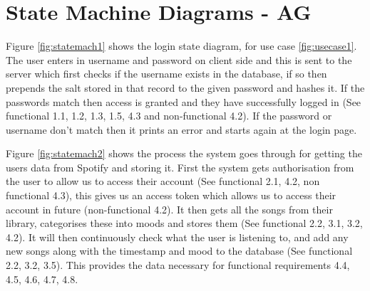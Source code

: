 \documentclass[10pt, notitlepage]{report}
\begin{document}
\section{State Machine Diagrams - AG}

Figure \ref{fig:statemach1} shows the login state diagram, for use case \ref{fig:usecase1}. The  user enters in username and password on client side and this is sent to the server which first checks if the username exists in the database, if so then prepends the salt stored in that record to the given password and hashes it. If the passwords match then access is granted and they have successfully logged in (See functional 1.1, 1.2, 1.3, 1.5, 4.3 and non-functional 4.2). If the password or username don’t match then it prints an error and starts again at the login page. 

Figure \ref{fig:statemach2} shows the process the system goes through for getting the users data from Spotify and storing it. First the system gets authorisation from the user to allow us to access their account (See functional 2.1, 4.2, non functional 4.3), this gives us an access token which allows us to access their account in future (non-functional 4.2). It then gets all the songs from their library, categorises these into moods and stores them (See functional 2.2, 3.1, 3.2, 4.2). It will then continuously check what the user is listening to, and add any new songs along with the timestamp and mood to the database (See functional 2.2, 3.2, 3.5). This provides the data necessary for functional requirements 4.4, 4.5, 4.6, 4.7, 4.8.
\end{document}
